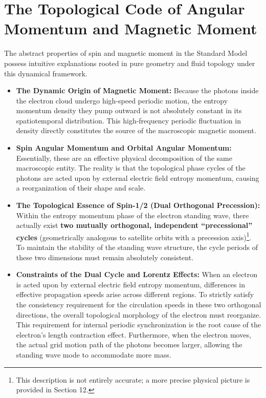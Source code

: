 \documentclass[12pt, a4paper]{article}
\begin{document}
\section{The Topological Code of Angular Momentum and Magnetic Moment}

The abstract properties of spin and magnetic moment in the Standard Model possess intuitive explanations rooted in pure geometry and fluid topology under this dynamical framework.

\begin{itemize}
    \item \textbf{The Dynamic Origin of Magnetic Moment:} Because the photons inside the electron cloud undergo high-speed periodic motion, the entropy momentum density they pump outward is not absolutely constant in its spatiotemporal distribution. This high-frequency periodic fluctuation in density directly constitutes the source of the macroscopic magnetic moment.
    \item \textbf{Spin Angular Momentum and Orbital Angular Momentum:} Essentially, these are an effective physical decomposition of the same macroscopic entity. The reality is that the topological phase cycles of the photons are acted upon by external electric field entropy momentum, causing a reorganization of their shape and scale.
    \item \textbf{The Topological Essence of Spin-1/2 (Dual Orthogonal Precession):} Within the entropy momentum phase of the electron standing wave, there actually exist \textbf{two mutually orthogonal, independent ``precessional'' cycles} (geometrically analogous to satellite orbits with a precession axis)\footnote{This description is not entirely accurate; a more precise physical picture is provided in Section 12.}. To maintain the stability of the standing wave structure, the cycle periods of these two dimensions must remain absolutely consistent.
    \item \textbf{Constraints of the Dual Cycle and Lorentz Effects:} When an electron is acted upon by external electric field entropy momentum, differences in effective propagation speeds arise across different regions. To strictly satisfy the consistency requirement for the circulation speeds in these two orthogonal directions, the overall topological morphology of the electron must reorganize. This requirement for internal periodic synchronization is the root cause of the electron's length contraction effect. Furthermore, when the electron moves, the actual grid motion path of the photons becomes larger, allowing the standing wave mode to accommodate more mass.

\end{itemize}
\end{document}

